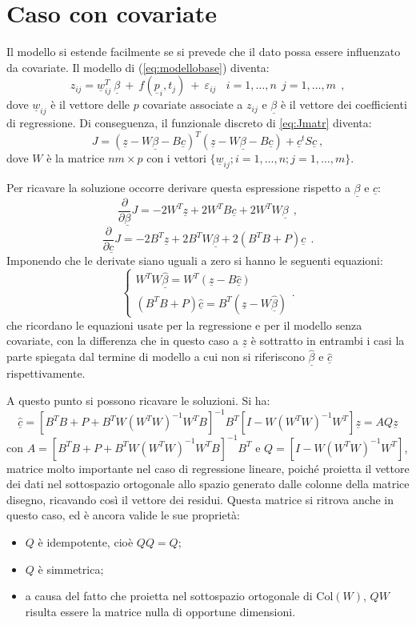 \documentclass[a4paper,11pt,twoside,openright]{book}							%
\begin{document}
\section{Caso con covariate}

Il modello si estende facilmente se si prevede che il dato possa essere influenzato da covariate. Il modello di (\ref{eq:modellobase}) diventa:
\begin{equation}
\label{eq:modellobasecovar}
z_{ij}= \underline w_{ij}^T\  \underline \beta   \ + \  f(\underline p_i,t_j)\ +\ \varepsilon_{ij}\ \ \ \ i = 1,\ldots,n\ \ j=1,\ldots,m \ \ ,
\end{equation}
dove $\underline w_{ij}$ è il vettore delle $p$ covariate associate a $z_{ij}$ e $\underline \beta$ è il vettore dei coefficienti di regressione. Di conseguenza, il funzionale discreto di \ref{eq:Jmatr} diventa:
$$ J = (\underline z - W \underline \beta - B \underline c)^T (\underline z - W \underline \beta - B \underline c) + \underline c^t S \underline c  \ ,$$
dove $W$ è la matrice $nm \times p$ con i vettori $ \{\underline w_{ij}; i=1,\ldots,n;j=1,\ldots,m\}$.

Per ricavare la soluzione occorre derivare questa espressione rispetto a $\underline \beta$ e $\underline c$:
$$
\frac{\partial}{\partial \underline \beta}J= -2W^T \underline z + 2W^T B \underline c + 2 W^TW \underline \beta \ \ ,
$$
$$
\frac{\partial}{\partial \underline c}J= -2 B^T \underline z + 2 B^T W \underline \beta + 2(B^T B + P) \underline c \ \ .
$$
Imponendo che le derivate siano uguali a zero si hanno le seguenti equazioni:
$$
\begin{cases}
W^TW \hat{\underline \beta} = W^T(\underline z - B \hat{\underline c})  \\
(B^T B + P) \hat{\underline c}=B^T(\underline z -W \hat{\underline \beta})
\end{cases}.
$$
che ricordano le equazioni usate per la regressione e per il modello senza covariate, con la differenza che in questo caso a $\underline z$ è sottratto in entrambi i casi la parte spiegata dal termine di modello a cui non si riferiscono $\hat{\underline \beta}$ e $\hat{\underline c}$ rispettivamente.

A questo punto si possono ricavare le soluzioni. Si ha:
$$
\hat  {\underline c}=[B^TB+P+B^TW(W^TW)^{-1}W^TB]^{-1}B^T[I-W(W^TW)^{-1}W^T]\underline z=AQ \underline z
$$
con $A=[B^TB+P+B^TW(W^TW)^{-1}W^TB]^{-1}B^T$ e $Q=[I-W(W^TW)^{-1}W^T]$, matrice molto importante nel caso di regressione lineare, poiché proietta il vettore dei dati nel sottospazio ortogonale allo spazio generato dalle colonne della matrice disegno, ricavando così il vettore dei residui. Questa matrice si ritrova anche in questo caso, ed è ancora valide le sue proprietà:
\begin{itemize}
\item $Q$ è idempotente, cioè $QQ=Q$;
\item $Q$ è simmetrica;
\item a causa del fatto che proietta nel sottospazio ortogonale di $\mathrm{Col}(W)$, $QW$ risulta essere la matrice nulla di opportune dimensioni. 
\end{itemize}
\end{document}
